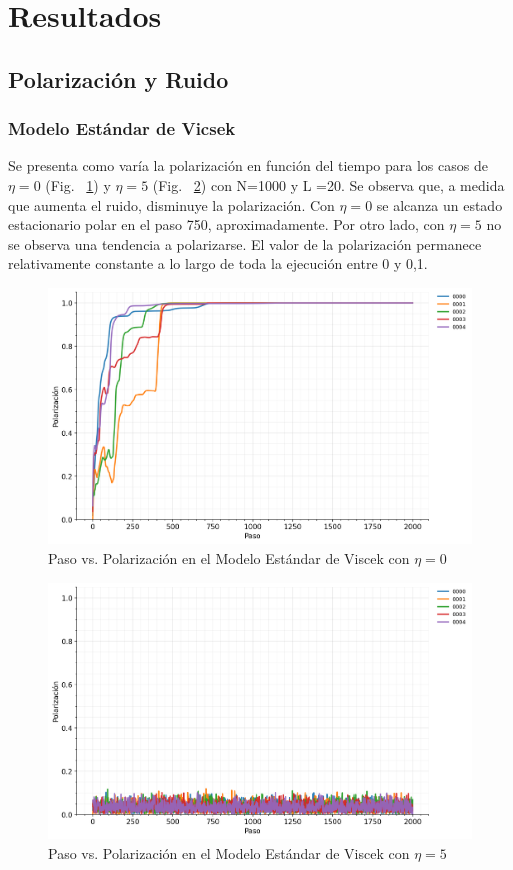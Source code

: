 \documentclass{article}
\begin{document}
\section{Resultados}

\subsection{Polarización y Ruido}
\subsubsection{Modelo Estándar de Vicsek}

Se presenta como varía la polarización en función del tiempo para los casos de \(\eta=0\) (Fig. ~\ref{fig:3}) y \(\eta = 5\) (Fig. ~\ref{fig:4}) con N=1000 y L =20. Se observa que, a medida que aumenta el ruido, disminuye la polarización. Con \(\eta=0\) se alcanza un estado estacionario polar en el paso 750, aproximadamente. Por otro lado, con \(\eta=5\) no se observa una tendencia a polarizarse. El valor de la polarización permanece relativamente constante a lo largo de toda la ejecución entre 0 y 0,1.
\begin{figure}[H]
    \centering
    \includegraphics[width=1\linewidth]{noise_0_SVM.png}
    \caption{Paso vs. Polarización en el Modelo Estándar de Viscek con \(\eta =0\)}
    \label{fig:3}
\end{figure}

\begin{figure}[H]
    \centering
    \includegraphics[width=1\linewidth]{noise_5_SVM.png}
    \caption{Paso vs. Polarización en el Modelo Estándar de Viscek con \(\eta = 5\)}
    \label{fig:4}
\end{figure}
\end{document}
